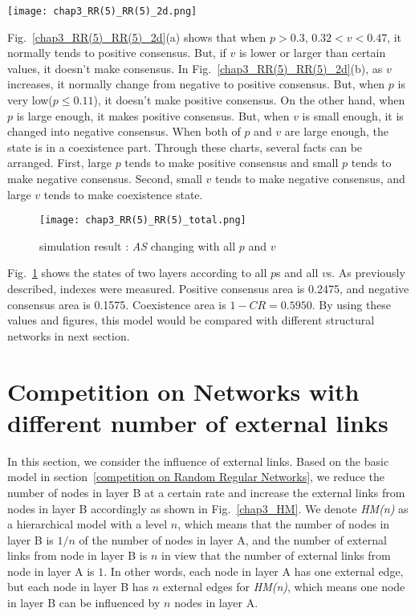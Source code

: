 \begin{figure*}[!htb]
	\centering
	\texttt{[image: chap3\_RR(5)\_RR(5)\_2d.png]}
	\caption{(a) $p$-\textit{AS} chart according to certain $v$ values. (b) $v$-\textit{AS} chart according to certain $p$ values.}
	\label{chap3_RR(5)_RR(5)_2d}
\end{figure*}
Fig.~\ref{chap3_RR(5)_RR(5)_2d}(a) shows that when $p > 0.3$, $0.32 < v < 0.47$, it normally tends to positive consensus. But, if $v$ is lower or larger than certain values, it doesn't make consensus.
In Fig.~\ref{chap3_RR(5)_RR(5)_2d}(b), as $v$ increases, it normally change from negative to positive consensus. But, when $p$ is very low($p \le 0.11$), it doesn't make positive consensus. On the other hand, when $p$ is large enough, it makes positive consensus. But, when $v$ is small enough, it is changed into negative consensus. When both of $p$ and $v$ are large enough, the state is in a coexistence part.
Through these charts, several facts can be arranged. First, large $p$ tends to make positive consensus and small $p$ tends to make negative consensus. Second, small $v$ tends to make negative consensus, and large $v$ tends to make coexistence state.  

\begin{figure}[!htb]
	\centering
	\texttt{[image: chap3\_RR(5)\_RR(5)\_total.png]}
	\caption{simulation result : \textit{AS} changing with all $p$ and $v$}
	\label{chap3_RR(5)_RR(5)_total}
\end{figure}
Fig.~\ref{chap3_RR(5)_RR(5)_total} shows the states of two layers according to all $p$s and all $v$s. As previously described, indexes were measured. Positive consensus area is 0.2475, and negative consensus area is 0.1575. Coexistence area is $1 - CR = 0.5950$. By using these values and figures, this model would be compared with different structural networks in next section. 

\section{Competition on Networks with different number of external links}

In this section, we consider the influence of external links. Based on the basic model in section~\ref{competition on Random Regular Networks}, we reduce the number of nodes in layer B at a certain rate and increase the external links from nodes in layer B accordingly as shown in Fig.~\ref{chap3_HM}.  We denote \textit{HM(n)} as a hierarchical model with a level $n$, which means that the number of nodes in layer B is $1/n$ of the number of nodes in layer A, and the number of external links from node in layer B is $n$ in view that the number of external links from node in layer A is $1$. In other words, each node in layer A has one external edge, but each node in layer B has $n$ external edges for \textit{HM(n)}, which means one node in layer B can be influenced by $n$ nodes in layer A.

